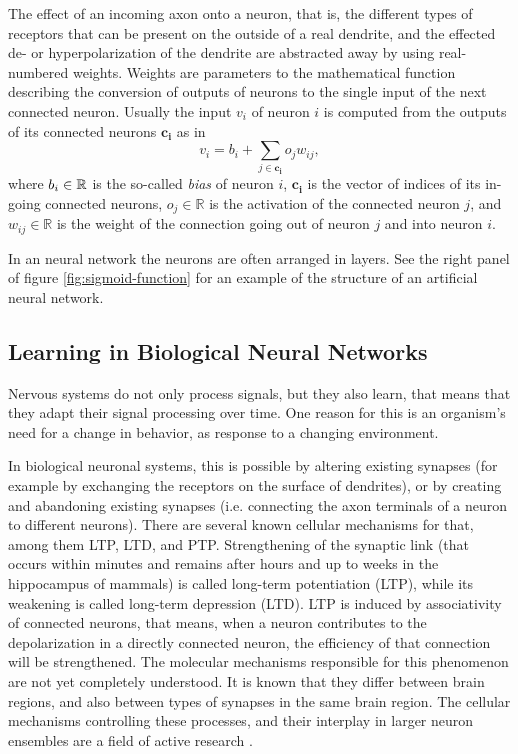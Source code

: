 The effect of an incoming axon onto a neuron, that is, the different
types of receptors that can be present on the outside of a real dendrite,
and the effected de- or hyperpolarization of the dendrite are abstracted
away by using real-numbered weights. Weights are parameters to the
mathematical function describing the conversion of outputs of neurons
to the single input of the next connected neuron. Usually the input
$v_{i}$ of neuron $i$ is computed from the outputs of its connected
neurons $\mathbf{c_{i}}$ as in
\begin{equation}
v_{i}=b_{i}+\sum_{j\in\mathbf{c_{i}}}o_{j}w_{ij},\label{eq:input-to-a-neuron}
\end{equation}
where $b_{i}\in\mbox{\ensuremath{\mathbb{R}}}$ is the so-called \emph{bias}\emph{
}of neuron $i$, $\mathbf{c_{i}}$ is the vector of indices of its
in-going connected neurons, $o_{j}\in\mathbb{R}$ is the activation
of the connected neuron $j$, and $w_{ij}\in\mathbb{R}$ is the weight
of the connection going out of neuron $j$ and into neuron $i$.

In an neural network the neurons are often arranged in layers. See
the right panel of figure \ref{fig:sigmoid-function} for an example
of the structure of an artificial neural network.

\subsection{Learning in Biological Neural Networks}

Nervous systems do not only process signals, but they also learn,
that means that they adapt their signal processing over time. One
reason for this is an organism's need for a change in behavior, as
response to a changing environment.

In biological neuronal systems, this is possible by altering existing
synapses (for example by exchanging the receptors on the surface of
dendrites), or by creating and abandoning existing synapses (i.e.
connecting the axon terminals of a neuron to different neurons). There
are several known cellular mechanisms for that, among them LTP, LTD,
and PTP\cite{BermudezFederico2007}. Strengthening of the synaptic
link (that occurs within minutes and remains after hours and up to
weeks in the hippocampus of mammals) is called long-term potentiation
(LTP), while its weakening is called long-term depression (LTD). LTP
is induced by associativity of connected neurons, that means, when
a neuron contributes to the depolarization in a directly connected
neuron, the efficiency of that connection will be strengthened. The
molecular mechanisms responsible for this phenomenon are not yet completely
understood. It is known that they differ between brain regions, and
also between types of synapses in the same brain region. The cellular
mechanisms controlling these processes, and their interplay in larger
neuron ensembles are a field of active research \cite{BermudezFederico2007}.

